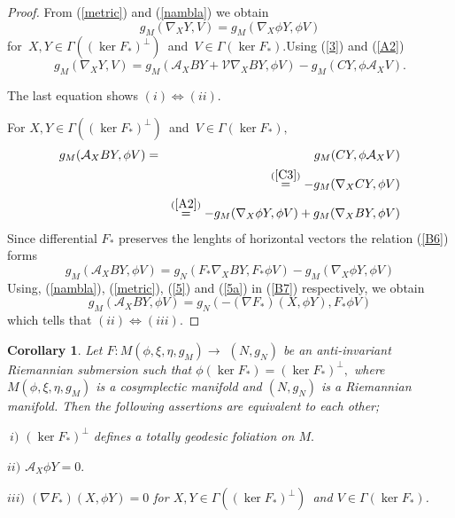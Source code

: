 \documentclass{amsart}
\theoremstyle{plain}
\newtheorem{corollary}{Corollary}
\numberwithin{equation}{section}
\begin{document}
\begin{proof}
From (\ref{metric}) and (\ref{nambla}) we obtain\begin{equation*}
g_{M}(\nabla _{X}Y,V)=g_{M}(\nabla _{X}\phi Y,\phi V)
\end{equation*}for\textit{\ }$X,Y\in \Gamma ((\ker F_{\ast })^{\bot })$\textit{\ }and\textit{\ }$V\in \Gamma (\ker F_{\ast }).$Using (\ref{3}) and (\ref{A2})\begin{equation*}
g_{M}(\nabla _{X}Y,V)=g_{M}(\mathcal{A}_{X}BY+\mathcal{V}\nabla _{X}BY,\phi
V)-g_{M}(CY,\phi \mathcal{A}_{X}V).
\end{equation*}

The last equation shows $(i)\Leftrightarrow (ii)$.

For $X,Y\in \Gamma ((\ker F_{\ast })^{\bot })$\textit{\ }and\textit{\ }$V\in
\Gamma (\ker F_{\ast }),$\begin{eqnarray}
g_{M}(\mathcal{A}_{X}BY,\phi V) &=&g_{M}(CY,\phi \mathcal{A}_{X}V)  \notag \\
&&\overset{(\ref{C3})}{=}-g_{M}(\nabla _{X}CY,\phi V)  \notag \\
&&\overset{(\ref{A2})}{=}-g_{M}(\nabla _{X}\phi Y,\phi V)+g_{M}(\nabla
_{X}BY,\phi V)  \label{B6}
\end{eqnarray}Since differential $F_{\ast }$ preserves the lenghts of horizontal vectors
the relation (\ref{B6}) forms\begin{equation}
g_{M}(\mathcal{A}_{X}BY,\phi V)=g_{N}(F_{\ast }\nabla _{X}BY,F_{\ast }\phi
V)-g_{M}(\nabla _{X}\phi Y,\phi V)  \label{B7}
\end{equation}Using, (\ref{nambla}), (\ref{metric}), (\ref{5}) and (\ref{5a}) in (\ref{B7}) respectively, we obtain\begin{equation*}
g_{M}(\mathcal{A}_{X}BY,\phi V)=g_{N}(-(\nabla F_{\ast })(X,\phi Y),F_{\ast
}\phi V)
\end{equation*}which tells that $(ii)\Leftrightarrow (iii).$
\end{proof}

\begin{corollary}
Let $F:M(\phi ,\xi ,\eta ,g_{M})\rightarrow $ $(N,g_{N})$ be an
anti-invariant Riemannian submersion such that $\phi (\ker F_{\ast })=(\ker
F_{\ast })^{\bot },$ where $M(\phi ,\xi ,\eta ,g_{M})$ is a cosymplectic
manifold and $(N,g_{N})$ is a Riemannian manifold. Then the following
assertions are equivalent to each other;

$\ i)$ $(\ker F_{\ast })^{\bot }$ \textit{defines a totally geodesic
foliation on }$M.$

$ii)$ $\mathcal{A}_{X}\phi Y=0.$

$iii)$ $(\nabla F_{\ast })(X,\phi Y)=0$ \textit{for }$X,Y\in \Gamma ((\ker
F_{\ast })^{\bot })$\textit{\ and }$V\in \Gamma (\ker F_{\ast })$.
\end{corollary}
\end{document}
